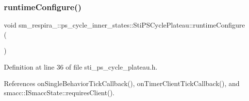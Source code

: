 \subsubsection{\texorpdfstring{runtime\+Configure()}{runtimeConfigure()}}
{\footnotesize\ttfamily void sm\+\_\+respira\+\_\+::ps\+\_\+cycle\+\_\+inner\+\_\+states\+::\+Sti\+P\+S\+Cycle\+Plateau\+::runtime\+Configure (\begin{DoxyParamCaption}{ }\end{DoxyParamCaption})\hspace{0.3cm}{\ttfamily [inline]}}



Definition at line 36 of file sti\+\_\+ps\+\_\+cycle\+\_\+plateau.\+h.



References on\+Single\+Behavior\+Tick\+Callback(), on\+Timer\+Client\+Tick\+Callback(), and smacc\+::\+I\+Smacc\+State\+::requires\+Client().


